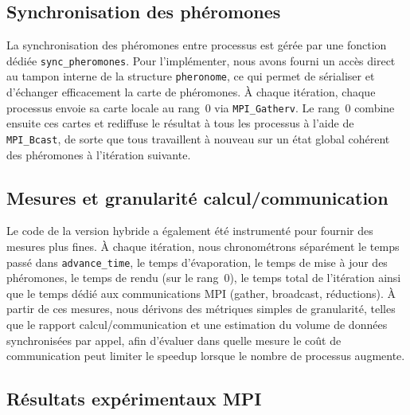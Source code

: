 \documentclass[12pt,a4paper]{article}
\begin{document}
\subsection{Synchronisation des phéromones}

La synchronisation des phéromones entre processus est gérée par une fonction dédiée \texttt{sync\_pheromones}. Pour l'implémenter, nous avons fourni un accès direct au tampon interne de la structure \texttt{pheronome}, ce qui permet de sérialiser et d'échanger efficacement la carte de phéromones. À chaque itération, chaque processus envoie sa carte locale au rang~0 via \texttt{MPI\_Gatherv}. Le rang~0 combine ensuite ces cartes et rediffuse le résultat à tous les processus à l'aide de \texttt{MPI\_Bcast}, de sorte que tous travaillent à nouveau sur un état global cohérent des phéromones à l'itération suivante.


\subsection{Mesures et granularité calcul/communication}

Le code de la version hybride a également été instrumenté pour fournir des mesures plus fines. À chaque itération, nous chronométrons séparément le temps passé dans \texttt{advance\_time}, le temps d'évaporation, le temps de mise à jour des phéromones, le temps de rendu (sur le rang~0), le temps total de l'itération ainsi que le temps dédié aux communications MPI (gather, broadcast, réductions). À partir de ces mesures, nous dérivons des métriques simples de granularité, telles que le rapport calcul/communication et une estimation du volume de données synchronisées par appel, afin d'évaluer dans quelle mesure le coût de communication peut limiter le speedup lorsque le nombre de processus augmente.

\subsection{Résultats expérimentaux MPI}
\end{document}
